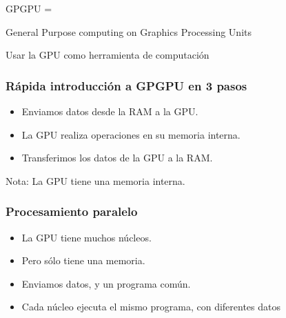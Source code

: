 \documentclass{beamer}
\begin{document}
\begin{frame}

GPGPU =

General	Purpose computing on Graphics Processing Units

\pause

Usar la GPU como herramienta de computación

\end{frame}



\begin{frame}
\frametitle{Rápida introducción a GPGPU en 3 pasos}

\begin{itemize}
\item Enviamos datos desde la RAM a la GPU.
\item La GPU realiza operaciones en su memoria interna.
\item Transferimos los datos de la GPU a la RAM.
\end{itemize}

Nota: La GPU tiene una memoria interna.

\end{frame}



\begin{frame}
\frametitle{Procesamiento paralelo}

\begin{itemize}
\item La GPU tiene muchos núcleos.
\item Pero sólo tiene una memoria.
\item Enviamos datos, y un programa común.
\item Cada núcleo ejecuta el mismo programa, con diferentes datos
\end{itemize}

\end{frame}
\end{document}
